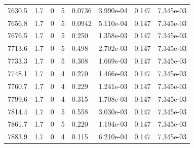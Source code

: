 \documentclass[preview]{standalone}
\begin{document}
{{{{{{{{{{{{{{\begin{tabular}{L{1.2cm}C{1.2cm} C{0.3cm}C{0.5cm} C{1.4cm}C{1.4cm} C{1.4cm}C{1.4cm}}
  7630.5  &   1.7  & 0     &  5 &  0.0736  & 3.990e-04  & 0.147 &  7.345e-03   \\ 
  7656.8  &   1.7  & 0     &  5 &  0.0942  & 5.110e-04  & 0.147 &  7.345e-03   \\ 
  7676.5  &   1.7  & 0     &  5 &  0.250  & 1.358e-03  & 0.147 &  7.345e-03   \\ 
  7713.6  &   1.7  & 0     &  5 &  0.498  & 2.702e-03  & 0.147 &  7.345e-03   \\ 
  7733.3  &   1.7  & 0     &  5 &  0.308  & 1.669e-03  & 0.147 &  7.345e-03   \\ 
  7748.1  &   1.7  & 0     &  4 &  0.270  & 1.466e-03  & 0.147 &  7.345e-03   \\ 
  7760.7  &   1.7  & 0     &  4 &  0.229  & 1.241e-03  & 0.147 &  7.345e-03   \\ 
  7799.6  &   1.7  & 0     &  4 &  0.315  & 1.708e-03  & 0.147 &  7.345e-03   \\ 
  7814.4  &   1.7  & 0     &  5 &  0.558  & 3.030e-03  & 0.147 &  7.345e-03   \\ 
  7861.7  &   1.7  & 0     &  5 &  0.220  & 1.194e-03  & 0.147 &  7.345e-03   \\ 
  7883.9  &   1.7  & 0     &  4 &  0.115  & 6.210e-04  & 0.147 &  7.345e-03   \\ 
\hline 
\end{tabular} 

}}}}}}}}}}}}}}
\end{document}
